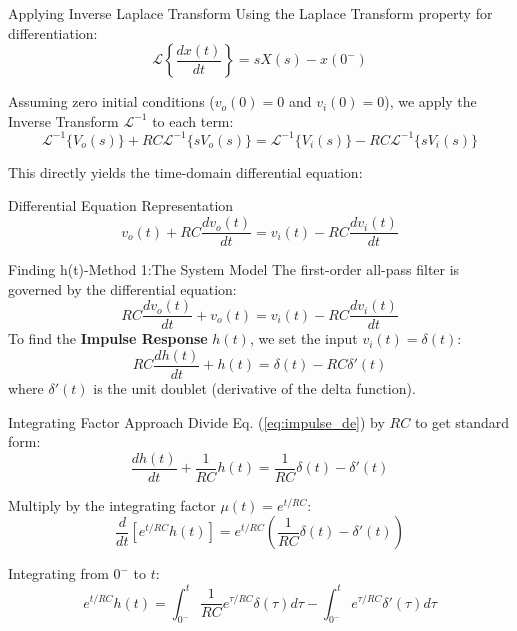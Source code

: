 \documentclass{beamer}
\begin{document}
\begin{frame}{ Applying Inverse Laplace Transform}
    Using the Laplace Transform property for differentiation:
    $$\mathcal{L} \left\{ \frac{dx(t)}{dt} \right\} = sX(s) - x(0^-)$$
    \par\vspace{0.3cm}
    Assuming zero initial conditions ($v_o(0) = 0$ and $v_i(0) = 0$), we apply the Inverse Transform $\mathcal{L}^{-1}$ to each term:
    $$\mathcal{L}^{-1} \{V_o(s)\} + RC \mathcal{L}^{-1} \{sV_o(s)\} = \mathcal{L}^{-1} \{V_i(s)\} - RC \mathcal{L}^{-1} \{sV_i(s)\}$$
    \par\vspace{0.3cm}
    This directly yields the time-domain differential equation:
    \begin{block}{Differential Equation Representation}
        $$v_o(t) + RC \frac{dv_o(t)}{dt} = v_i(t) - RC \frac{dv_i(t)}{dt}$$
    \end{block}
\end{frame}
\begin{frame}{Finding h(t)-Method 1:The System Model}
    The first-order all-pass filter is governed by the differential equation:
    \begin{equation*}
        RC \frac{dv_o(t)}{dt} + v_o(t) = v_i(t) - RC \frac{dv_i(t)}{dt}
    \end{equation*}
    \vfill
    To find the \textbf{Impulse Response} $h(t)$, we set the input $v_i(t) = \delta(t)$:
    \begin{equation}
        RC \frac{dh(t)}{dt} + h(t) = \delta(t) - RC \delta'(t) \label{eq:impulse_de}
    \end{equation}
    where $\delta'(t)$ is the unit doublet (derivative of the delta function).
\end{frame}


\begin{frame}{ Integrating Factor Approach}
    Divide Eq. (\ref{eq:impulse_de}) by $RC$ to get standard form:
    $$\frac{dh(t)}{dt} + \frac{1}{RC}h(t) = \frac{1}{RC}\delta(t) - \delta'(t)$$
    \par\vspace{0.3cm}
    Multiply by the integrating factor $\mu(t) = e^{t/RC}$:
    $$\frac{d}{dt} \left[ e^{t/RC} h(t) \right] = e^{t/RC} \left( \frac{1}{RC}\delta(t) - \delta'(t) \right)$$
    \par\vspace{0.3cm}
    Integrating from $0^-$ to $t$:
    $$e^{t/RC} h(t) = \int_{0^-}^t \frac{1}{RC}e^{\tau/RC}\delta(\tau)d\tau - \int_{0^-}^t e^{\tau/RC}\delta'(\tau)d\tau$$
\end{frame}
\end{document}
